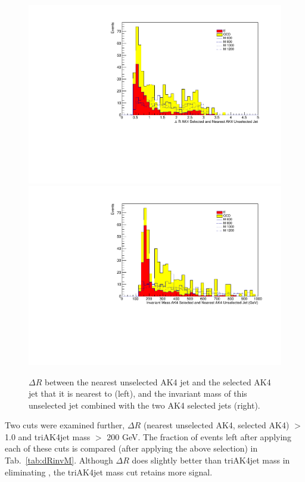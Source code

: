 \begin{figure}[thb!]
\begin{center}
\includegraphics[scale=0.34]{Figures/emSRdRsnAK4cl.pdf}
\includegraphics[scale=0.34]{Figures/emSRinvmsnAK4cl.pdf}
\end{center}
\caption{$\Delta R$ between the nearest unselected AK4 jet and the selected AK4 jet that it is nearest to (left), and the invariant mass of this unselected jet combined with the two AK4 selected jets (right).}
\label{fig:dRMAK4}
\end{figure} 

Two cuts were examined further, $\Delta R$ (nearest unselected AK4, selected AK4) $>$ 1.0 and triAK4jet mass $>$ 200 GeV. The fraction of events left after applying each of these cuts is compared (after applying the above selection) in Tab.~\ref{tab:dRinvM}. Although $\Delta R$ does slightly better than triAK4jet mass in eliminating \ttbar, the triAK4jet mass cut retains more signal.

